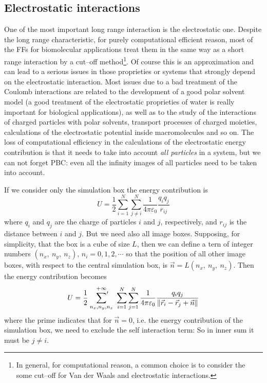 \subsection{Electrostatic interactions}
\label{sec:longRangeInt}
One of the most important long range interaction is the electrostatic one. Despite the long range characteristic, for purely computational efficient reason, most of the \acp{FF} for biomolecular applications treat them in the same way as a short range interaction by a cut--off method\footnote{In general, for computational reason, a common choice is to consider the some cut--off for Van der Waals and electrostatic interactions.}. Of course this is an approximation and can lead to a serious issues in those proprieties or systems that strongly depend on the electrostatic interaction. Most issues due to a bad treatment of the Coulomb interactions are related to the development of a good polar solvent model (a good treatment of the electrostatic proprieties of water is really important for biological applications), as well as to the study of the interactions of charged particles with polar solvents, transport processes of charged moieties, calculations of the electrostatic potential inside macromolecules and so on. The loss of computational efficiency in the calculations of the electrostatic energy contribution is that it needs to take into account \textit{all particles} in a system, but we can not forget \ac{PBC}: even all the infinity images of all particles need to be taken into account.

If we consider only the simulation box the energy contribution is
\begin{equation}
	U = \frac{1}{2}\sum_{i=1}^N\sum_{j\ne i}^N\frac{1}{4\pi\varepsilon_0}\frac{q_iq_j}{r_{ij}}
	\label{eq:electrostatic}
\end{equation}
where $q_i$ and $q_j$ are the charge of particles $i$ and $j$, respectively, and $r_{ij}$ is the distance between $i$ and $j$. But we need also all image boxes. Supposing, for simplicity, that the box is a cube of size $L$, then we can define a tern of integer numbers $(n_x,\ n_y,\ n_z)$, $n_i=0,1,2,\cdots$ so that the position of all other image boxes, with respect to the central simulation box, is $\vec n = L (n_x,\ n_y,\ n_z)$. Then the energy contribution becomes
\begin{equation}
	U = \frac{1}{2}\ \sideset{}{'}\sum_{n_x,n_y,n_z}^{+\infty}\ \sum_{i=1}^N\sum_{j=1}^N\frac{1}{4\pi\varepsilon_0}\frac{q_iq_j}{\|\vec r_i - \vec r_j + \vec n \|}
	\label{eq:electrostaticImage}
\end{equation}
where the prime indicates that for $\vec n = 0$, i.e. the energy contribution of the simulation box, we need to exclude the self interaction term: So in inner sum it must be $j \ne i$.

